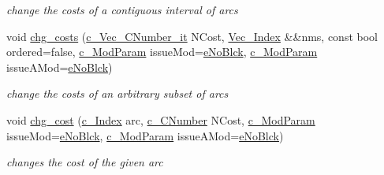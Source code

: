 \begin{Indent}
\begin{DoxyCompactItemize}
\begin{DoxyCompactList}\small\item\em change the costs of a contiguous interval of arcs \end{DoxyCompactList}\item 
void \mbox{\hyperlink{class_s_m_spp__di__unipi__it_1_1_m_c_f_block_aa5e5b9ed0a813a3e09ef80fe0ee3920c}{chg\+\_\+costs}} (\mbox{\hyperlink{class_s_m_spp__di__unipi__it_1_1_m_c_f_block_aa2211b659beb942cfb7618c11033831e}{c\+\_\+\+Vec\+\_\+\+C\+Number\+\_\+it}} N\+Cost, \mbox{\hyperlink{class_s_m_spp__di__unipi__it_1_1_m_c_f_block_a9a1284953e2aa5222b5867c0a7f98499}{Vec\+\_\+\+Index}} \&\&nms, const bool ordered=false, \mbox{\hyperlink{group___modification___t_y_p_e_s_ga544246d8c462e9a2d817c2c30797968f}{c\+\_\+\+Mod\+Param}} issue\+Mod=\mbox{\hyperlink{group___modification___t_y_p_e_s_gga48fddcdd03a03f49b7e389ca1ed938d4ada69e89c5f46e563d8a13cfa6830c136}{e\+No\+Blck}}, \mbox{\hyperlink{group___modification___t_y_p_e_s_ga544246d8c462e9a2d817c2c30797968f}{c\+\_\+\+Mod\+Param}} issue\+A\+Mod=\mbox{\hyperlink{group___modification___t_y_p_e_s_gga48fddcdd03a03f49b7e389ca1ed938d4ada69e89c5f46e563d8a13cfa6830c136}{e\+No\+Blck}})
\begin{DoxyCompactList}\small\item\em change the costs of an arbitrary subset of arcs \end{DoxyCompactList}\item 
void \mbox{\hyperlink{class_s_m_spp__di__unipi__it_1_1_m_c_f_block_a3d5efc1373ecc4f71e494c915663b6c4}{chg\+\_\+cost}} (\mbox{\hyperlink{class_s_m_spp__di__unipi__it_1_1_m_c_f_block_aee6156e2ce80720d57a082d80f39d8cc}{c\+\_\+\+Index}} arc, \mbox{\hyperlink{class_s_m_spp__di__unipi__it_1_1_m_c_f_block_a8e47cae4e16e180273d262aae769a854}{c\+\_\+\+C\+Number}} N\+Cost, \mbox{\hyperlink{group___modification___t_y_p_e_s_ga544246d8c462e9a2d817c2c30797968f}{c\+\_\+\+Mod\+Param}} issue\+Mod=\mbox{\hyperlink{group___modification___t_y_p_e_s_gga48fddcdd03a03f49b7e389ca1ed938d4ada69e89c5f46e563d8a13cfa6830c136}{e\+No\+Blck}}, \mbox{\hyperlink{group___modification___t_y_p_e_s_ga544246d8c462e9a2d817c2c30797968f}{c\+\_\+\+Mod\+Param}} issue\+A\+Mod=\mbox{\hyperlink{group___modification___t_y_p_e_s_gga48fddcdd03a03f49b7e389ca1ed938d4ada69e89c5f46e563d8a13cfa6830c136}{e\+No\+Blck}})
\begin{DoxyCompactList}\small\item\em changes the cost of the given arc \end{DoxyCompactList}\item 

\end{DoxyCompactItemize}
\end{Indent}
